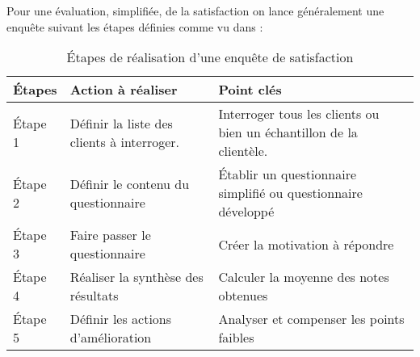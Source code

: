             Pour une évaluation, simplifiée, de la satisfaction on lance généralement
            une enquête suivant les étapes définies comme vu dans
            \cite[Tab. \ref{table:etapeDeRealistaionEnqSatisfat}]{Barouch2010} :
            \begin{longtable}{p{2cm} p{5cm} p{6cm}}
                \caption{Étapes de réalisation d’une enquête de satisfaction}
                \label{table:etapeDeRealistaionEnqSatisfat}
                \\\hline\hline
                    \textbf{Étapes} & \textbf{Action à réaliser} & \textbf{Point cl{\'e}s}
                \\\hline\hline
                    Étape 1 & Définir la liste des clients à interroger.
                    & Interroger tous les clients ou bien un échantillon de la clientèle.
                    \\
                    Étape 2 & Définir le contenu du questionnaire & Établir
                    un questionnaire simplifié ou questionnaire développé
                    \\
                    Étape 3 & Faire passer le questionnaire & Créer la motivation à répondre
                    \\
                    Étape 4 & Réaliser la synthèse des résultats & Calculer la moyenne des notes
                    obtenues
                    \\
                    Étape 5 & Définir les actions d’amélioration & Analyser et compenser les points
                    faibles 
                \\\bottomrule
            \end{longtable}
